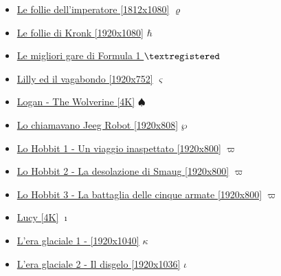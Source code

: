 \begin{itemize}
			\item \href{https://mega.nz/#!Beg2VI4R!MVHt0UuctaMyr-ZB4-villC14sFL9LTZt_bapfrA4Us} {Le follie dell'imperatore [1812x1080]}  $\varrho$ \\ 
			\item \href{https://mega.nz/#!Lq5AAK7a!hIutBEb1TPQAAFfnQZkmRA_V0QMaM_QBn6YB7mSt3Dg} {Le follie di Kronk [1920x1080]}  $\hbar$ \\ 
			\item \href{https://mega.nz/#F!njggnSYT!lPXHfgOlvi4AHpjRb3ekkw} {Le migliori gare di Formula 1 }  $\textregistered$ \\ 
			\item \href{https://mega.nz/#!dnhBSZRZ!7kgwfqxfLgXT8ERlmnR7TMqMRoAZ9dZgtXCf3PuQtIo} {Lilly ed il vagabondo [1920x752]}  $\varsigma$ \\ 
			\item \href{https://mega.nz/#!LeZRgRaL!0du6KS2H4LNWqTgKD17l1BmFCoh7Kc3gF1dNaeqhkHQ}  {Logan - The Wolverine [4K]}  $\spadesuit$ \\ 
			\item \href{https://mega.nz/#!re4nXZKB!4fnYcA40OKca0KasXFSmmpsmIR17KO_oA_ViRTil3UY}  {Lo chiamavano Jeeg Robot [1920x808]}  $\wp$ \\ 
			\item \href{https://mega.nz/#!OZ8QiCxa!B_iKio0oTTpFIG0GmNPc66x35InJrdwRsaqXTXIqSFg}  {Lo Hobbit 1 - Un viaggio inaspettato [1920x800]}  $\varpi$ \\ 
			\item \href{https://mega.nz/#!qN8E0KoJ!-IYKQWP_PfL8n9-EtFwTc5NbUvHNCp7nuwX3n0eLmU4}  {Lo Hobbit 2 - La desolazione di Smaug [1920x800]}  $\varpi$ \\ 	
			\item \href{https://mega.nz/#!7QdTlQIC!DNCkOlW9nEyOmClPfgIKGd9xu3jHPVs2nZtoWmoIOwU}  {Lo Hobbit 3 - La battaglia delle cinque armate [1920x800]}  $\varpi$ \\ 		
			\item \href{https://mega.nz/#!HvZhlaTA!55QyphPA-LrNX0N8LYcOqng9ejan2MVuwVg1DM_GRGs}  {Lucy [4K]}  $\imath$ \\ 		
			\item \href{https://mega.nz/#!aZxwBQJD!azAAGmwKed6GVmOseKYOk-Ch4vsq6nVQumd3uV1Vs7Y} {L'era glaciale 1 -  [1920x1040]}  $\kappa$ \\ 		
			\item \href{https://mega.nz/#!l4Z03Z4B!1XwY_UAPg34BSHvUoU5huwEU2OrQDmqRRktvzFIxcJs} {L'era glaciale 2 - Il disgelo [1920x1036]}  $\iota$ \\ 

\end{itemize}
